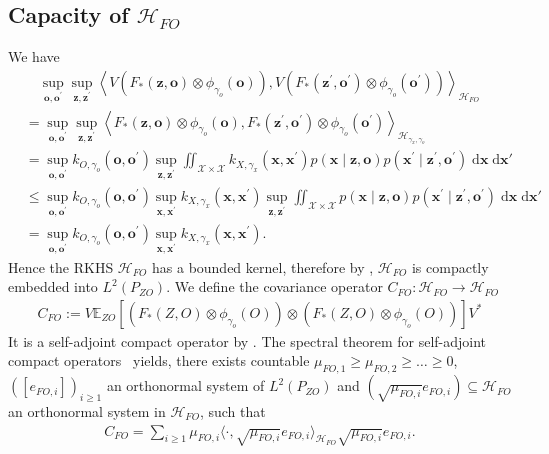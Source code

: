 \documentclass[11pt]{article}
\newcommand{\bx}{\mathbf x}
\newcommand{\bz}{\mathbf z}
\newcommand{\bo}{\mathbf o}
\newcommand{\calH}{\mathcal{H}}
\newcommand{\calX}{\mathcal{X}}
\newcommand{\0}{\mathbf{0}}
\begin{document}
\begin{appendix}
\subsection{Capacity of $\calH_{FO}$}
\label{sec:capacity}
We have
\begin{align*}
    &\quad \sup_{\bo,\bo^\prime} \sup_{\bz,\bz^\prime} \left\langle V (F_{\ast}(\bz,\bo) \otimes \phi_{\gamma_o}(\bo)), V (F_{\ast}(\bz^\prime,\bo^\prime) \otimes \phi_{\gamma_o}(\bo^\prime) ) \right\rangle_{\calH_{FO}} \\
    &= \sup_{\bo,\bo^\prime} \sup_{\bz,\bz^\prime} \left\langle F_{\ast}(\bz,\bo) \otimes \phi_{\gamma_o}(\bo), F_{\ast}(\bz^\prime,\bo^\prime) \otimes \phi_{\gamma_o}(\bo^\prime) \right\rangle_{\calH_{\gamma_x,\gamma_o}} \\
    &= \sup_{\bo,\bo^\prime} k_{O, \gamma_o}(\bo, \bo^\prime) \sup_{\bz,\bz^\prime} \iint_{\calX\times\calX} k_{X, \gamma_x}(\bx, \bx^\prime)p(\bx \mid \bz,\bo) p(\bx^\prime \mid \bz^\prime,\bo^\prime)\;\mathrm{d}\bx\;\mathrm{d}\bx'\\
    &\leq \sup_{\bo,\bo^\prime}k_{O, \gamma_o}(\bo, \bo^\prime) \sup_{\bx,\bx^\prime} k_{X, \gamma_x}(\bx, \bx^\prime) \sup_{\bz,\bz^\prime} \iint_{\calX\times\calX} p(\bx \mid \bz,\bo) p(\bx^\prime \mid \bz^\prime,\bo^\prime)\;\mathrm{d}\bx\;\mathrm{d}\bx' \\
    &= \sup_{\bo,\bo^\prime} k_{O, \gamma_o}(\bo, \bo^\prime) \sup_{\bx,\bx^\prime}k_{X, \gamma_x}(\bx, \bx^\prime) . 
\end{align*}
Hence the RKHS $\calH_{FO}$ has a bounded kernel, therefore by \citet[Lemma 2.3]{steinwart2012mercer}, $\calH_{FO}$ is compactly embedded into $L^2(P_{ZO})$. We define the covariance operator $C_{FO}: \calH_{FO} \to \calH_{FO}$ 
\begin{align*}
    C_{FO} := V\mathbb{E}_{ZO}\left[(F_{\ast}(Z,O)\otimes \phi_{\gamma_o}(O))\otimes (F_{\ast}(Z,O)\otimes \phi_{\gamma_o}(O))\right]V^{\ast} 
\end{align*}
It is a self-adjoint compact operator by \citet[Lemma 2.2]{steinwart2012mercer}.
The spectral theorem for self-adjoint compact
operators~\cite[Theorems VI.16,
VI.17]{reed1980methods} yields, there exists countable $\mu_{FO,1}\geq \mu_{FO,2}\geq \dots \geq 0$,  $([e_{FO,i}])_{i\geq 1}$ an orthonormal system of $L^2(P_{ZO})$ and $\left(\sqrt{\mu_{FO,i}}e_{FO,i}\right)\subseteq \calH_{FO}$ an orthonormal system in $\calH_{FO}$, such that 
\begin{align}\label{eq:C_F_covariance}
    C_{FO} = \sum_{i\geq 1}\mu_{FO,i}\langle \cdot, \sqrt{\mu_{FO,i}}e_{FO,i}\rangle_{\calH_{FO}} \sqrt{\mu_{FO,i}}e_{FO,i}.

\end{align}
\end{appendix}
\end{document}
